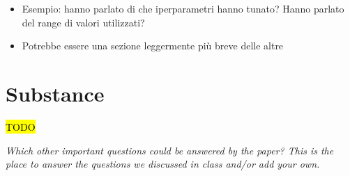 \documentclass[letterpaper,11pt]{article}
\begin{document}
\begin{itemize}
  \item Esempio: hanno parlato di che iperparametri hanno tunato? Hanno parlato del range di valori utilizzati?
  \item Potrebbe essere una sezione leggermente più breve delle altre 
\end{itemize}




\section{Substance}

\hl{TODO}

\textit{Which other important questions could be answered by the paper? This is the place to answer the questions we discussed in class and/or add your own.}




\newpage



\end{document}
